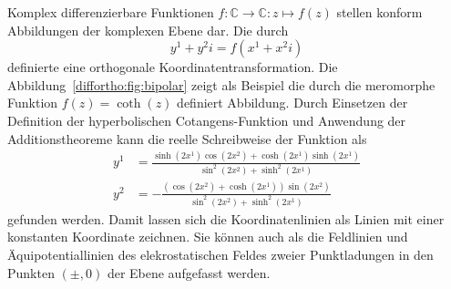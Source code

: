 Komplex differenzierbare Funktionen
$f\colon\mathbb{C}\to\mathbb{C}:z\mapsto f(z)$
stellen konform Abbildungen der komplexen Ebene dar.
Die durch
\[
y^1 + y^2i
=
f(x^1 + x^2i)
\]
definierte eine orthogonale Koordinatentransformation.
%
Die Abbildung~\ref{diffortho:fig:bipolar} zeigt als Beispiel
die durch die meromorphe Funktion $f(z) = \coth(z)$ definiert
Abbildung.
Durch Einsetzen der Definition der hyperbolischen Cotangens-Funktion
und Anwendung der Additionstheoreme kann die reelle Schreibweise der
Funktion als
\begin{align*}
y^1
&=
\frac{
\sinh(2x^1)\cos(2x^2)+\cosh(2x^1)\sinh(2x^1)
}{
\sin^2(2x^2)+\sinh^2(2x^1)
}
\\
y^2
&=
-\frac{
(\cos(2x^2)+\cosh(2x^1))\sin(2x^2)
}{
\sin^2(2x^2)+\sinh^2(2x^1)
}
\end{align*}
gefunden werden.
Damit lassen sich die Koordinatenlinien als Linien mit einer
konstanten Koordinate zeichnen.
Sie können auch als die Feldlinien und Äquipotentiallinien des
elekrostatischen Feldes zweier Punktladungen in den Punkten $(\pm,0)$
der Ebene aufgefasst werden.



